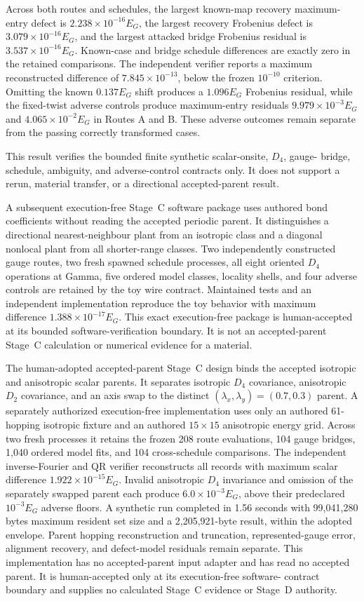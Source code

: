 Across both routes and schedules, the largest known-map recovery
maximum-entry defect is $2.238\times10^{-16}E_G$, the largest recovery Frobenius
defect is $3.079\times10^{-16}E_G$, and the largest attacked bridge Frobenius
residual is $3.537\times10^{-16}E_G$. Known-case and bridge schedule differences
are exactly zero in the retained comparisons. The independent verifier reports
a maximum reconstructed difference of $7.845\times10^{-13}$, below the frozen
$10^{-10}$ criterion. Omitting the known $0.137E_G$ shift produces a
$1.096E_G$ Frobenius residual, while the fixed-twist adverse controls produce
maximum-entry residuals $9.979\times10^{-3}E_G$ and
$4.065\times10^{-2}E_G$ in Routes A and B. These adverse outcomes remain
separate from the passing correctly transformed cases.

This result verifies the bounded finite synthetic scalar-onsite, $D_4$, gauge-
bridge, schedule, ambiguity, and adverse-control contracts only. It does not
support a rerun, material transfer, or a directional accepted-parent result.

A subsequent execution-free Stage~C software package uses authored bond
coefficients without reading the accepted periodic parent. It distinguishes a
directional nearest-neighbour plant from an isotropic class and a diagonal
nonlocal plant from all shorter-range classes. Two independently constructed
gauge routes, two fresh spawned schedule processes, all eight oriented $D_4$
operations at Gamma, five ordered model classes, locality shells, and four
adverse controls are retained by the toy wire contract. Maintained tests and an
independent implementation reproduce the toy behavior with maximum difference
$1.388\times10^{-17}E_G$. This exact execution-free package is human-accepted
at its bounded software-verification boundary. It is not an accepted-parent
Stage~C calculation or numerical evidence for a material.

The human-adopted accepted-parent Stage~C design binds the accepted isotropic
and anisotropic scalar parents. It separates isotropic $D_4$ covariance,
anisotropic $D_2$ covariance, and an axis swap to the distinct
$(\lambda_x,\lambda_y)=(0.7,0.3)$ parent. A separately authorized execution-free
implementation uses only an authored 61-hopping isotropic fixture and an authored
$15\times15$ anisotropic energy grid. Across two fresh processes it retains the
frozen 208 route evaluations, 104 gauge bridges, 1,040 ordered model fits, and
104 cross-schedule comparisons. The independent inverse-Fourier and QR verifier
reconstructs all records with maximum scalar difference
$1.922\times10^{-15}E_G$. Invalid anisotropic $D_4$ invariance and omission of
the separately swapped parent each produce $6.0\times10^{-3}E_G$, above their
predeclared $10^{-3}E_G$ adverse floors. A synthetic run completed in 1.56
seconds with 99,041,280 bytes maximum resident set size and a 2,205,921-byte
result, within the adopted envelope. Parent hopping reconstruction and
truncation, represented-gauge error, alignment recovery, and defect-model
residuals remain separate. This implementation has no accepted-parent input
adapter and has read no accepted parent. It is human-accepted only at its execution-free software-
contract boundary and supplies no calculated Stage~C evidence or Stage~D
authority.

